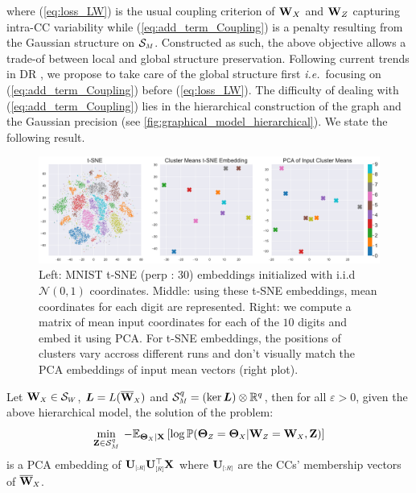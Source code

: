 where (\ref{eq:loss_LW}) is the usual coupling criterion of $\mathbf{W}_X$ and $\mathbf{W}_Z$ capturing intra-CC variability while (\ref{eq:add_term_Coupling}) is a penalty resulting from the Gaussian structure on $\mathcal{S}_{\scaleto{M}{4pt}}$. Constructed as such, the above objective allows a trade-of between local and global structure preservation. Following current trends in DR \cite{kobak2021initialization}, we propose to take care of the global structure first \textit{i.e.}\ focusing on (\ref{eq:add_term_Coupling}) before (\ref{eq:loss_LW}). The difficulty of dealing with (\ref{eq:add_term_Coupling}) lies in the hierarchical construction of the graph and the Gaussian precision (see \cref{fig:graphical_model_hierarchical}). We state the following result.

\begin{figure}
\begin{center}
\centerline{\includegraphics[width=0.5\columnwidth]{Figures/tSNE_truth.pdf}}
\caption{Left: MNIST t-SNE (perp : 30) embeddings initialized with i.i.d $\mathcal{N}(0,1)$ coordinates. Middle: using these t-SNE embeddings, mean coordinates for each digit are represented. Right: we compute a matrix of mean input coordinates for each of the $10$ digits and embed it using PCA. For t-SNE embeddings, the positions of clusters vary accross different runs and don't visually match the PCA embeddings of input mean vectors (right plot).}
\label{fig:tSNE-clusters-truth}
\end{center}
\end{figure}

\begin{corollary}\label{corollary_ccPCA}
Let $\Wb_{\scaleto{X}{4pt}} \in \mathcal{S}_{\scaleto{W}{4pt}}$, $\bm{L} = L(\overline{\Wb}_{\scaleto{X}{4pt}})$ and $\mathcal{S}^q_{\scaleto{M}{4pt}}= (\ker \bm{L}) \otimes \mathbb{R}^q$, then for all $\varepsilon > 0$, given the above hierarchical model, the solution of the problem:
$$\min_{\Zb \in \mathcal{S}^q_{M}} \: -\mathbb{E}_{\bm{\Theta}_{\scaleto{X}{3pt}}| \Xb}\left[ \log \mathbb{P}(\bm{\Theta}_{\scaleto{Z}{4pt}} = \bm{\Theta}_{\scaleto{X}{4pt}}| \Wb_{\scaleto{Z}{4pt}} = \Wb_{\scaleto{X}{4pt}}, \Zb) \right]$$
is a PCA embedding of $\Ub_{\scaleto{[:R]}{5pt}}\Ub_{\scaleto{[R]}{5pt}}^\top\Xb$ where $\Ub_{\scaleto{[:R]}{5pt}}$ are the CCs' membership vectors of $\overline{\Wb}_{\scaleto{X}{4pt}}$.
\end{corollary}

